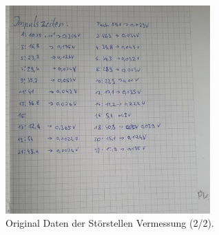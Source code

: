     \begin{figure}[h]
        \centering
        \includegraphics[width=0.7\textwidth]{latex/images/Original_Daten_2.jpeg}
        \caption{Original Daten der Störstellen Vermessung (2/2).}
    \end{figure}
